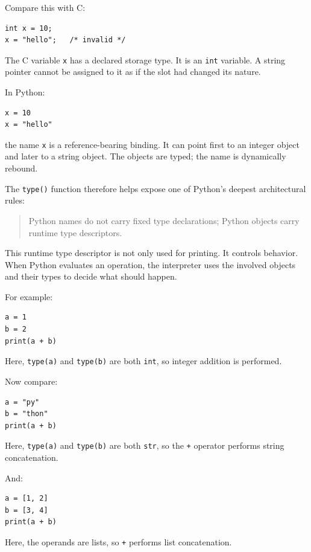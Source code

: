 Compare this with C:

\begin{verbatim}
int x = 10;
x = "hello";   /* invalid */
\end{verbatim}

The C variable \texttt{x} has a declared storage type. It is an \texttt{int} variable. A string pointer cannot be assigned to it as if the slot had changed its nature.

In Python:

\begin{verbatim}
x = 10
x = "hello"
\end{verbatim}

the name \texttt{x} is a reference-bearing binding. It can point first to an integer object and later to a string object. The objects are typed; the name is dynamically rebound.

The \texttt{type()} function therefore helps expose one of Python's deepest architectural rules:

\begin{quote}
Python names do not carry fixed type declarations; Python objects carry runtime type descriptors.
\end{quote}

This runtime type descriptor is not only used for printing. It controls behavior. When Python evaluates an operation, the interpreter uses the involved objects and their types to decide what should happen.

For example:

\begin{verbatim}
a = 1
b = 2
print(a + b)
\end{verbatim}

Here, \texttt{type(a)} and \texttt{type(b)} are both \texttt{int}, so integer addition is performed.

Now compare:

\begin{verbatim}
a = "py"
b = "thon"
print(a + b)
\end{verbatim}

Here, \texttt{type(a)} and \texttt{type(b)} are both \texttt{str}, so the \texttt{+} operator performs string concatenation.

And:

\begin{verbatim}
a = [1, 2]
b = [3, 4]
print(a + b)
\end{verbatim}

Here, the operands are lists, so \texttt{+} performs list concatenation.

